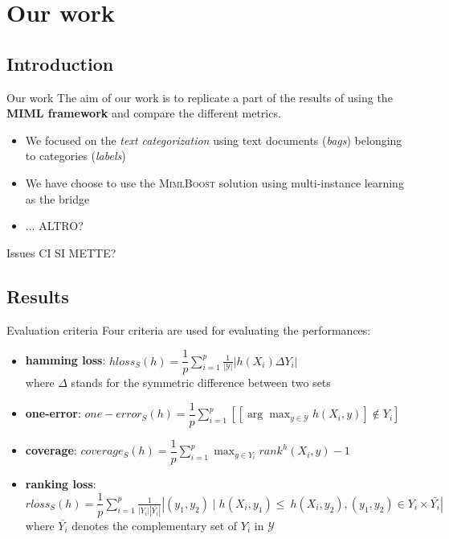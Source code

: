 \section{Our work}

\subsection*{Introduction}
\begin{frame}{Our work}
	The aim of our work is to replicate a part of the results of \cite{miml1} using the \textbf{MIML framework} and compare the different metrics.\\
	\vspace{12px}
	\begin{itemize}
		\item We focused on the \textit{text categorization} using text documents (\textit{bags}) belonging to categories (\textit{labels})
		\item We have choose to use the \textsc{MimlBoost} solution using multi-instance learning as the bridge
		\item ... ALTRO?
	\end{itemize}
	
	
\end{frame}
\begin{frame}{Issues}
	CI SI METTE?
	
\end{frame}

\subsection{Results}
\begin{frame}{Evaluation criteria}
	Four criteria are used for evaluating the performances:
	\begin{itemize}
		\item \textbf{hamming loss}: $hloss_S(h) = \dfrac{1}{p}\sum_{i=1}^{p}\frac{1}{|\mathcal{Y}|}|h(X_i)\Delta Y_i|$ \\ where $\Delta$ stands for the symmetric difference between two sets
		\item \textbf{one-error}: $one-error_S(h)=\dfrac{1}{p}\sum_{i=1}^{p}[[\arg \max_{y \in \mathcal{Y}} h(X_i,y)]\notin Y_i]$
		\item \textbf{coverage}: $coverage_S(h)=\dfrac{1}{p}\sum_{i=1}^{p}\max_{y \in Y_i}rank^h(X_i,y)-1$
		\item \textbf{ranking loss}: $rloss_S(h) = \dfrac{1}{p}\sum_{i=1}^{p}\frac{1}{|Y_i||\bar{Y_i}|}|{(y_1,y_2) \mid}h(X_i,y_1)\leq \ h(X_i,y_2), (y_1,y_2) \in Y_i \times \bar{Y_i} |$ \\ where $\bar{Y_i}$ denotes the complementary
		set of $Y_i$ in $\mathcal{Y}$
	\end{itemize}
\end{frame}

